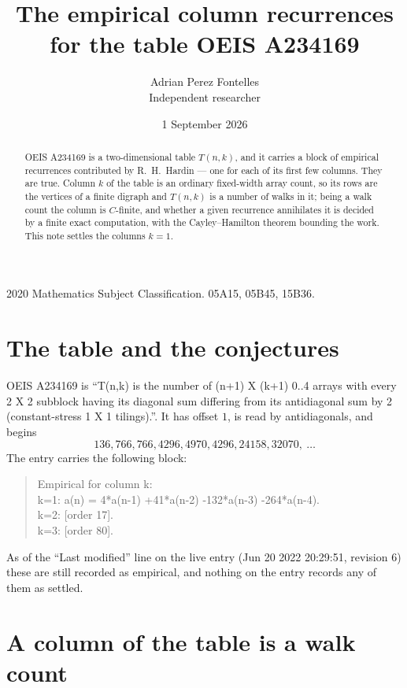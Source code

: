 \documentclass[11pt,a4paper]{article}
\title{The empirical column recurrences for the table OEIS A234169}
\author{Adrian Perez Fontelles\\ \small Independent researcher}
\date{1 September 2026}
\theoremstyle{plain}
\theoremstyle{definition}
\begin{document}
\maketitle

\begin{abstract}
OEIS A234169 is a two-dimensional table $T(n,k)$, and it carries a block of empirical
recurrences contributed by R.~H.~Hardin --- one for each of its first few columns. They are
true. Column $k$ of the table is an ordinary fixed-width array count, so its rows are the
vertices of a finite digraph and $T(n,k)$ is a number of walks in it; being a walk count the
column is $C$-finite, and whether a given recurrence annihilates it is decided by a finite
exact computation, with the Cayley--Hamilton theorem bounding the work. This note settles the columns $k=1$.
\end{abstract}

\noindent\small 2020 Mathematics Subject Classification. 05A15, 05B45, 15B36.\normalsize

\section{The table and the conjectures}

OEIS A234169 is ``T(n,k) is the number of (n+1) X (k+1) 0..4 arrays with every 2 X 2 subblock having its diagonal sum differing from its antidiagonal sum by 2 (constant-stress 1 X 1 tilings).''. It has offset $1$, is
read by antidiagonals, and begins
\[
136, 766, 766, 4296, 4970, 4296, 24158, 32070,\ \dots
\]
The entry carries the following block:
\begin{quote}\small
Empirical for column k:\\
k=1: a(n) = 4*a(n-1) +41*a(n-2) -132*a(n-3) -264*a(n-4).\\
k=2: [order 17].\\
k=3: [order 80].\\
\end{quote}
As of the ``Last modified'' line on the live entry (Jun 20 2022 20:29:51, revision 6) these are still
recorded as empirical, and nothing on the entry records any of them as settled.

\section{A column of the table is a walk count}
\end{document}
